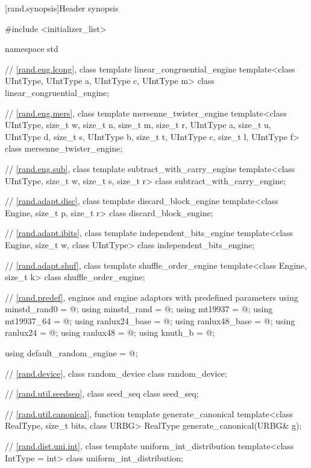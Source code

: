 [rand.synopsis]{Header  synopsis}%
%

\begin{codeblock}
#include <initializer_list>

namespace std {

 // \ref{rand.eng.lcong}, class template linear_congruential_engine
 template<class UIntType, UIntType a, UIntType c, UIntType m>
   class linear_congruential_engine;

 // \ref{rand.eng.mers}, class template mersenne_twister_engine
 template<class UIntType, size_t w, size_t n, size_t m, size_t r,
          UIntType a, size_t u, UIntType d, size_t s,
          UIntType b, size_t t,
          UIntType c, size_t l, UIntType f>
   class mersenne_twister_engine;

 // \ref{rand.eng.sub}, class template subtract_with_carry_engine
 template<class UIntType, size_t w, size_t s, size_t r>
   class subtract_with_carry_engine;

 // \ref{rand.adapt.disc}, class template discard_block_engine
 template<class Engine, size_t p, size_t r>
   class discard_block_engine;

 // \ref{rand.adapt.ibits}, class template independent_bits_engine
 template<class Engine, size_t w, class UIntType>
   class independent_bits_engine;

 // \ref{rand.adapt.shuf}, class template shuffle_order_engine
 template<class Engine, size_t k>
   class shuffle_order_engine;

 // \ref{rand.predef}, engines and engine adaptors with predefined parameters
 using minstd_rand0  = @\seebelow@;
 using minstd_rand   = @\seebelow@;
 using mt19937       = @\seebelow@;
 using mt19937_64    = @\seebelow@;
 using ranlux24_base = @\seebelow@;
 using ranlux48_base = @\seebelow@;
 using ranlux24      = @\seebelow@;
 using ranlux48      = @\seebelow@;
 using knuth_b       = @\seebelow@;

 using default_random_engine = @\seebelow@;

 // \ref{rand.device}, class random_device
 class random_device;

 // \ref{rand.util.seedseq}, class seed_seq
 class seed_seq;

 // \ref{rand.util.canonical}, function template generate_canonical
 template<class RealType, size_t bits, class URBG>
   RealType generate_canonical(URBG& g);

 // \ref{rand.dist.uni.int}, class template uniform_int_distribution
 template<class IntType = int>
   class uniform_int_distribution;

}
\end{codeblock}
